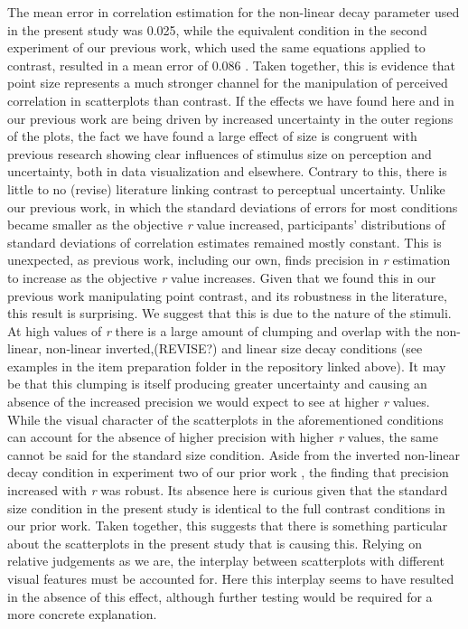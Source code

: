 \documentclass{vgtc}                          %
\begin{document}
The mean error in correlation estimation for the non-linear decay parameter used
in the present study was 0.025, while the equivalent condition in the second experiment
of our previous work, which used the same equations applied to contrast, resulted
in a mean error of 0.086 \cite{strain_2023}. Taken together, this is evidence that point size represents a much stronger channel for the manipulation of perceived correlation in scatterplots than contrast. If the effects
we have found here and in our previous work
are being driven by increased uncertainty in the outer regions of the plots,
the fact we have found a large effect of size is congruent with previous research
\cite{hong_2021, grice_1983, alais_2004} showing clear influences of stimulus
size on perception and uncertainty, both in data visualization and elsewhere. Contrary to this,
there is little to no (revise) literature linking contrast to perceptual
uncertainty. Unlike our previous work, in which the standard deviations of errors
for most conditions became smaller as the objective \emph{r} value increased, participants'
distributions of standard deviations of correlation estimates remained mostly constant. This
is unexpected, as previous work, including our own, finds precision
in \emph{r} estimation to increase as the objective \emph{r} value increases. Given that we found
this in our previous work \cite{strain_2023} manipulating point contrast, and
its robustness in the literature, this result is surprising. We suggest that this
is due to the nature of the stimuli. At high values of \emph{r} there is a large amount
of clumping and overlap with the non-linear, non-linear inverted,(REVISE?) and linear size decay conditions (see examples
in the item preparation folder in the repository linked above). It may be that this
clumping is itself producing greater uncertainty and causing an absence of the increased
precision we would expect to see at higher \emph{r} values. While the visual character
of the scatterplots in the aforementioned conditions can account for the absence
of higher precision with higher \emph{r} values, the same cannot be said for the standard size
condition. Aside from the inverted non-linear decay condition in experiment two of
our prior work \cite{strain_2023}, the finding that precision increased with \emph{r}
was robust. Its absence here is curious given that the standard size condition in
the present study is identical to the full contrast conditions in our prior work.
Taken together, this suggests that there is something particular about the scatterplots
in the present study that is causing this. Relying on relative judgements as we are,
the interplay between scatterplots with different visual features must be accounted for.
Here this interplay seems to have resulted in the absence of this effect, although
further testing would be required for a more concrete explanation.
\end{document}
